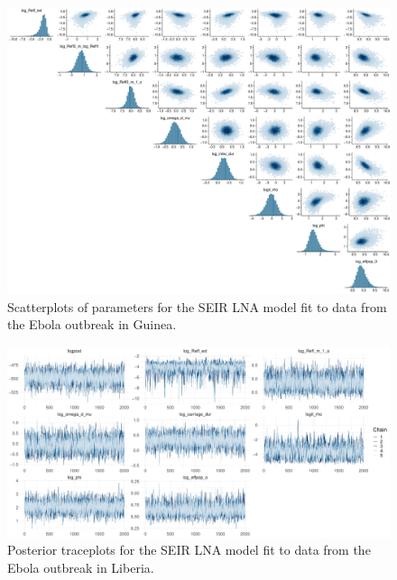 \begin{figure}[htbp]
	\centering
	\includegraphics[width=\linewidth]{figures/guin_tight_pairs}
	\caption{Scatterplots of parameters for the SEIR LNA model fit to data from the Ebola outbreak in Guinea.}
	\label{fig:guineapairs}
\end{figure}

\begin{figure}
	\centering
	\includegraphics[width=\linewidth]{figures/lib_tight_traces}
	\caption{Posterior traceplots for the SEIR LNA model fit to data from the Ebola outbreak in Liberia.}
	\label{fig:liberiatraces}
\end{figure}

